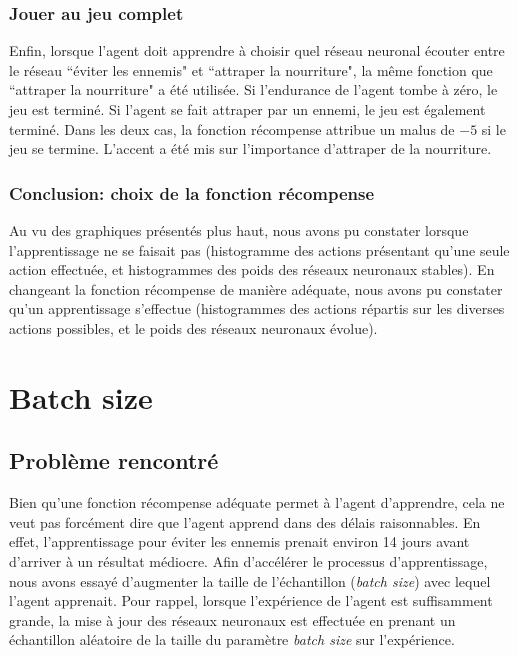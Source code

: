 \documentclass[11pt,a4paper]{report}
\begin{document}
   \newpage
   \subsubsection{Jouer au jeu complet}
   
   \par Enfin, lorsque l'agent doit apprendre à choisir quel réseau neuronal écouter entre le réseau ``éviter les ennemis" et ``attraper la nourriture", la même fonction que ``attraper la nourriture" a été utilisée. Si l'endurance de l'agent tombe à zéro, le jeu est terminé. Si l'agent se fait attraper par un ennemi, le jeu est également terminé. Dans les deux cas, la fonction récompense attribue un malus de $-5$ si le jeu se termine. L'accent a été mis sur l'importance d'attraper de la nourriture.

  \subsubsection{Conclusion: choix de la fonction récompense}   
  
  \par Au vu des graphiques présentés plus haut, nous avons pu constater lorsque l'apprentissage ne se faisait pas (histogramme des actions présentant qu'une seule action effectuée, et histogrammes des poids des réseaux neuronaux stables). En changeant la fonction récompense de manière adéquate, nous avons pu constater qu'un apprentissage s'effectue (histogrammes des actions répartis sur les diverses actions possibles, et le poids des réseaux neuronaux évolue). 
   
   \newpage
   \section{Batch size}
   
   \subsection{Problème rencontré}
   
   \par Bien qu'une fonction récompense adéquate permet à l'agent d'apprendre, cela ne veut pas forcément dire que l'agent apprend dans des délais raisonnables. En effet, l'apprentissage pour éviter les ennemis prenait environ 14 jours avant d'arriver à un résultat médiocre. Afin d'accélérer le processus d'apprentissage, nous avons essayé d'augmenter la taille de l'échantillon (\textit{batch size}) avec lequel l'agent apprenait. Pour rappel, lorsque l’expérience de l'agent est suffisamment grande, la mise à jour des réseaux neuronaux est effectuée en prenant un échantillon aléatoire de la taille du paramètre \textit{batch size} sur l'expérience. 
   
\end{document}
